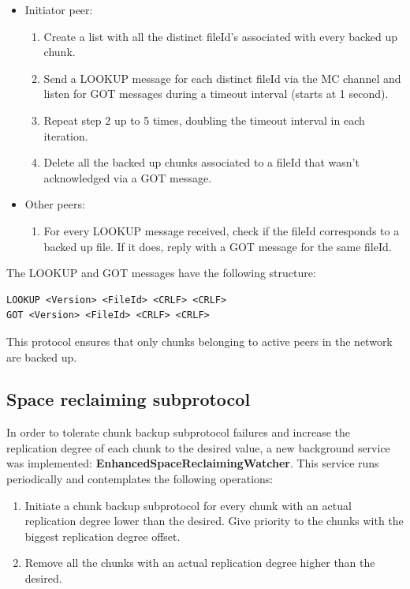 \documentclass[a4paper]{article}
\begin{document}
\begin{itemize}
	\item Initiator peer:
		\begin{enumerate}
			\item Create a list with all the distinct fileId's associated with every backed up chunk.
			\item Send a LOOKUP message for each distinct fileId via the MC channel and listen for GOT messages during a timeout interval (starts at 1 second).
			\item Repeat step 2 up to 5 times, doubling the timeout interval in each iteration.
			\item Delete all the backed up chunks associated to a fileId that wasn't acknowledged via a GOT message.
		\end{enumerate}
		
	\item Other peers:
		\begin{enumerate}
			\item For every LOOKUP message received, check if the fileId corresponds to a backed up file. If it does, reply with a GOT message for the same fileId.
		\end{enumerate}
\end{itemize}

The LOOKUP and GOT messages have the following structure:

\begin{verbatim}
LOOKUP <Version> <FileId> <CRLF> <CRLF>
GOT <Version> <FileId> <CRLF> <CRLF>
\end{verbatim}

This protocol ensures that only chunks belonging to active peers in the network are backed up.

\subsection{Space reclaiming subprotocol}

In order to tolerate chunk backup subprotocol failures and increase the replication degree of each chunk to the desired value, a new background service was implemented: \textbf{EnhancedSpaceReclaimingWatcher}. This service runs periodically and contemplates the following operations:

\begin{enumerate}
	\item Initiate a chunk backup subprotocol for every chunk with an actual replication degree lower than the desired. Give priority to the chunks with the biggest replication degree offset.
	\item Remove all the chunks with an actual replication degree higher than the desired.
\end{enumerate}
\end{document}
